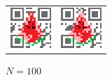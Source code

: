 \documentclass{thesis}
\begin{document}
\begin{figure}[H]
  \begin{tabular}{cc}
    \begin{minipage}[t]{0.45\hsize}
      \centering
      \includegraphics[width=0.5\linewidth]{pic/Tahara_10_54.eps}
       \caption{$N=10$}
      \label{fig:output_10}
    \end{minipage} &
    \begin{minipage}[t]{0.45\hsize}
     \centering
      \includegraphics[width=0.5\linewidth]{pic/Tahara_100_46.eps}
       \caption{$N=100$}
      \label{fig:output_100}
      \end{minipage}
  \end{tabular}
\end{figure}

\end{document}
